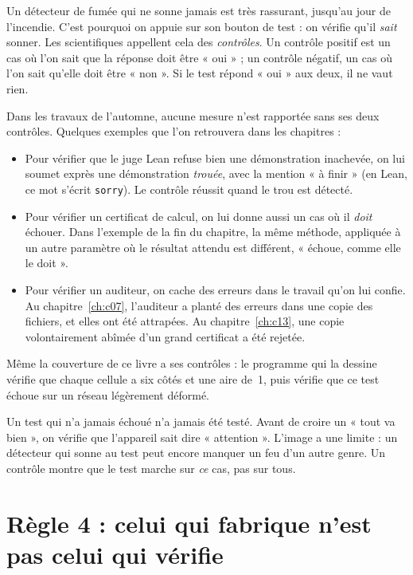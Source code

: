 Un détecteur de fumée qui ne sonne jamais est très rassurant, jusqu'au jour de l'incendie. C'est pourquoi on appuie
sur son bouton de test : on vérifie qu'il \emph{sait} sonner. Les scientifiques appellent cela des \emph{contrôles}.
Un contrôle positif est un cas où l'on sait que la réponse doit être « oui » ; un contrôle négatif, un cas où l'on sait
qu'elle doit être « non ». Si le test répond « oui » aux deux, il ne vaut rien.

Dans les travaux de l'automne, aucune mesure n'est rapportée sans ses deux contrôles. Quelques exemples que l'on retrouvera dans les
chapitres :
\begin{itemize}
\item Pour vérifier que le juge Lean refuse bien une démonstration inachevée, on lui soumet exprès une démonstration
\emph{trouée}, avec la mention « à finir » (en Lean, ce mot s'écrit \texttt{sorry}). Le contrôle réussit quand le trou
est détecté.
\item Pour vérifier un certificat de calcul, on lui donne aussi un cas où il \emph{doit} échouer. Dans l'exemple de la
fin du chapitre, la même méthode, appliquée à un autre paramètre où le résultat attendu est différent, « échoue, comme
elle le doit ».
\item Pour vérifier un auditeur, on cache des erreurs dans le travail qu'on lui confie. Au chapitre~\ref{ch:c07},
l'auditeur a planté des erreurs dans une copie des fichiers, et elles ont été attrapées. Au chapitre~\ref{ch:c13}, une
copie volontairement abîmée d'un grand certificat a été rejetée.
\end{itemize}
Même la couverture de ce livre a ses contrôles : le programme qui la dessine vérifie que chaque cellule a six côtés et
une aire de~1, puis vérifie que ce test échoue sur un réseau légèrement déformé.

\begin{analogie}
Un test qui n'a jamais échoué n'a jamais été testé. Avant de croire un « tout va bien », on vérifie que l'appareil
sait dire « attention ». L'image a une limite : un détecteur qui sonne au test peut encore manquer un feu d'un autre
genre. Un contrôle montre que le test marche sur \emph{ce} cas, pas sur tous.
\end{analogie}

\section{Règle 4 : celui qui fabrique n'est pas celui qui vérifie}

